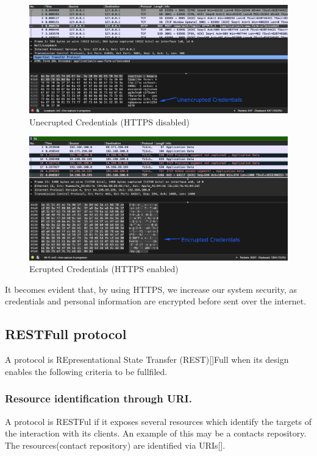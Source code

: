 			\begin{figure}[H]
				\iftrue
				\caption{Unecrupted Credentials (HTTPS disabled)}
				\centering
				\includegraphics[scale=0.3]{figures/http}
				\fi
			\end{figure}
			\begin{figure}[H]
				\iftrue
				\caption{Ecrupted Credentials (HTTPS enabled)}
				\centering
				\includegraphics[scale=0.3]{figures/https}
				\fi
			\end{figure}
			It becomes evident that, by using HTTPS, we increase our system security, as credentials and personal information are encrypted before sent over the internet.
		\subsection{RESTFull protocol}
			A protocol is REpresentational State Transfer (REST)[\cite{pautasso_zimmermann_leymann_2008}]Full when its design enables the following criteria to be fullfiled.
			\subsubsection{Resource identification through URI.}
				A protocol is RESTFul if it exposes several resources which identify the targets of the interaction with its clients. 
				An example of this may be a contacts repository. The resources(contact repository) are identified via URIs[\cite{uri-rfc3986}].

